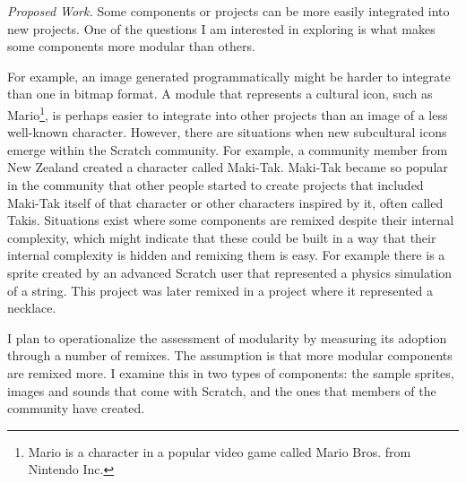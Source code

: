 \emph{Proposed Work.}
Some components or projects can be more easily integrated into new projects. 
One of the questions I am interested in exploring is what makes some components more modular than others.

For example, an image generated programmatically might be harder to integrate than one in bitmap format. 
A module that represents a cultural icon, such as Mario\footnote{Mario is a character in a popular video game called Mario Bros. from Nintendo Inc.}, is perhaps easier to integrate into other projects than an image of a less well-known character.
However, there are situations when new subcultural icons emerge within the Scratch community.
For example, a community member from New Zealand created a character called Maki-Tak. 
Maki-Tak became so popular in the community that other people started to create projects that included Maki-Tak itself of  that character or other characters inspired by it, often called Takis.
Situations exist where some components are remixed despite their internal complexity, which might indicate that these could be built in a way that their internal complexity is hidden and remixing them is easy. 
For example there is a sprite created by an advanced Scratch user that represented a physics simulation of a string. 
This project was later remixed in a project where it represented a necklace.

I plan to operationalize the assessment of modularity by measuring its adoption through a number of remixes.
The assumption is that more modular components are remixed more.
I examine this in two types of components: the sample sprites, images and sounds that come with Scratch, and the ones that members of the community have created.

